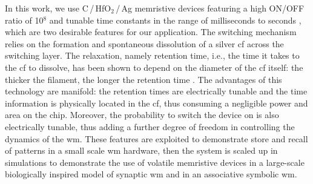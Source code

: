 In this work, we use C\,/\,HfO$\mathrm{_{2}}$\,/\,Ag memristive devices featuring a high ON/OFF ratio of 10$^8$ and tunable time constants in the range of milliseconds to seconds \cite{wang2021AdvIntellSys,covi2021TED-I}, which are two desirable features for our application. The switching mechanism relies on the formation and spontaneous dissolution of a silver \gls{cf} across the switching layer. The relaxation, namely retention time, i.e., the time it takes to the \gls{cf} to dissolve, has been shown to depend on the diameter of the \gls{cf} itself: the thicker the filament, the longer the retention time \cite{wang2019TED-I,wang2019TED-II,wang2021TED-II}. The advantages of this technology are manifold: the retention times are electrically tunable and the time information is physically located in the \gls{cf}, thus consuming a negligible power and area on the chip. Moreover, the probability to switch the device on is also electrically tunable, thus adding a further degree of freedom in controlling the dynamics of the \gls{wm}. These features are exploited to demonstrate store and recall of patterns in a small scale \gls{wm} hardware, then the system is scaled up in simulations to demonstrate the use of volatile memristive devices in a large-scale biologically inspired model of synaptic \gls{wm} and in an associative symbolic \gls{wm}.



